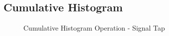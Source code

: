 \documentclass[12pt]{article}
\begin{document}
  \subsection{Cumulative Histogram}
    \begin{figure}[H]
    \caption{Cumulative Histogram Operation - Signal Tap}
    \label{fig:norm_histcum}
  \end{figure}
  
\end{document}
